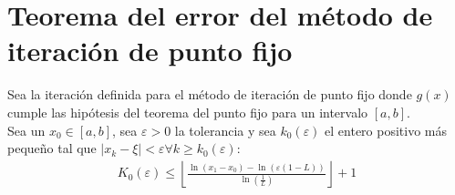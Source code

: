 \documentclass{article}
\begin{document}
\section{Teorema del error del método de iteración de punto fijo}
    Sea la iteración definida para el método de iteración de punto fijo donde $g(x)$ cumple las
    hipótesis del teorema del punto fijo para un intervalo $[a,b]$.\\
    Sea un $x_{0} \in [a,b]$, sea $\varepsilon > 0$ la tolerancia y sea $k_{0}(\varepsilon )$
    el entero positivo más pequeño tal que $|x_{k} - \xi | < \varepsilon  \forall k \geq k_{0}(\varepsilon )$:
    \begin{equation}
        \begin{split}
            K_{0}(\varepsilon ) \leq \left \lfloor{\frac{\ln(x_{1}-x_{0})-\ln (\varepsilon (1-L))}
            {\ln (\frac{1}{L})}}\right \rfloor +1
        \end{split}
    \end{equation}
\end{document}
